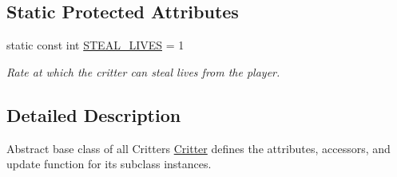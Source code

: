 \subsection*{Static Protected Attributes}
\begin{DoxyCompactItemize}
\item 
static const int \hyperlink{class_critter_a1324eb838f1790e904a0b82c9ceed173}{S\+T\+E\+A\+L\+\_\+\+L\+I\+V\+E\+S} = 1
\begin{DoxyCompactList}\small\item\em Rate at which the critter can steal lives from the player. \end{DoxyCompactList}\end{DoxyCompactItemize}


\subsection{Detailed Description}
Abstract base class of all Critters \hyperlink{class_critter}{Critter} defines the attributes, accessors, and update function for its subclass instances. 

